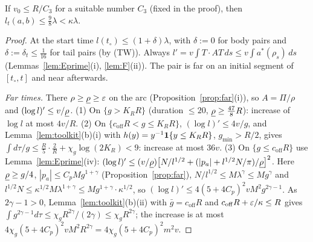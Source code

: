 \begin{proposition}[Length]\label{prop:length}
If $v_0\le R/C_3$ for a suitable number $C_3$ (fixed in the proof), then $l_t(a,b)\le\frac98\lambda<\kappa\lambda$.
\end{proposition}

\begin{proof}
At the start time $l(t_\circ)\le(1+\delta)\lambda$, with $\delta:=0$ for body pairs and $\delta:=\delta_t\le\frac1{16}$ for
tail pairs (by (TW)). Always $l'=v\int T\cdot AT\,ds\le v\int a^*(\rho_s)\,ds$ (Lemmas~\ref{lem:Eprime}(i),
\ref{lem:F}(ii)). The pair is far on an initial segment of $[t_\circ,t]$ and near afterwards.

\emph{Far times.} There $\rho\ge\underline{\rho}\ge\varepsilon$ on the arc (Proposition~\ref{prop:far}(i)), so $A=\Pi/\rho$ and
$(\log l)'\le v/\underline{\rho}$. (1) On $\{g>K_RR\}$ (duration $\le20$, $\underline{\rho}\ge\frac{47}8R$): increase of $\log l$ at most
$4v/R$. (2) On $\{c_{\mathrm{off}}R<g\le K_RR\}$, $(\log l)'\le4v/g$, and Lemma~\ref{lem:toolkit}(b)(i) with
$h(y)=y^{-1}\mathbf{1}\{y\le K_RR\}$, $g_{\min}>R/2$, gives $\int d\tau/g\le\frac R5\cdot\frac2R+\chi_g\log(2K_R)<9$: increase
at most $36v$. (3) On $\{g\le c_{\mathrm{off}}R\}$ use Lemma~\ref{lem:Eprime}(iv):
$(\log l)'\le(v/\underline{\rho})\bigl[N/l^{1/2}+(|p_a|+l^{1/2}N/\pi)/\underline{\rho}\bigr]^2$. Here $\underline{\rho}\ge g/4$, $|p_a|\le C_pMg^{1+\gamma}$
(Proposition~\ref{prop:far}), $N/l^{1/2}\le M\lambda^{\gamma}\le Mg^\gamma$ and $l^{1/2}N\le\kappa^{1/2}M\lambda^{1+\gamma}\le Mg^{1+\gamma}\cdot\kappa^{1/2}$,
so $(\log l)'\le4(5+4C_p)^2vM^2g^{2\gamma-1}$. As $2\gamma-1>0$, Lemma~\ref{lem:toolkit}(b)(ii) with $\bar g=c_{\mathrm{off}}R$ and
$c_{\mathrm{off}}R+\varepsilon/\kappa\le R$ gives $\int g^{2\gamma-1}d\tau\le\chi_gR^{2\gamma}/(2\gamma)\le\chi_gR^{2\gamma}$; the increase
is at most $4\chi_g(5+4C_p)^2vM^2R^{2\gamma}=4\chi_g(5+4C_p)^2m^2v$.


\end{proof}
